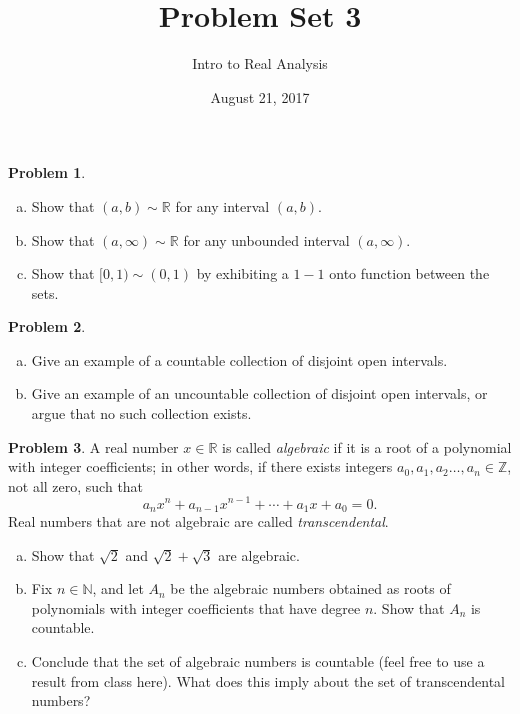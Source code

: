 \documentclass{amsart}
\newcommand{\+}[1]{\ensuremath{\mathbf{#1}}}
\newcommand{\Z}{{\mathbb Z}}
\newcommand{\R}{{\mathbb R}}
\theoremstyle{definition}
\newtheorem{prob}{Problem}
\begin{document}
\title{Problem Set 3}
\date{August 21, 2017}
\author{Intro to Real Analysis}

\maketitle




\begin{prob}
\begin{enumerate}[(a)]
 \item Show that $(a,b) \sim \R$ for any interval $(a,b)$.
 \item Show that $(a, \infty) \sim \R$
 for any unbounded interval $(a, \infty)$.
 \item Show that $[0,1) \sim (0,1)$
 by exhibiting a $1-1$ onto function between the sets.
\end{enumerate}
\end{prob}

\begin{prob}
\begin{enumerate}[(a)]
 \item Give an example of a countable collection of 
 disjoint open intervals.
 \item Give an example of an uncountable collection of 
 disjoint open intervals, or argue that no such 
 collection exists.
\end{enumerate}
\end{prob}

\begin{prob}
 A real number $x \in \R$ is called \emph{algebraic}
 if it is a root of a polynomial with integer coefficients;
 in other words, if there exists integers $a_0, a_1, a_2 \ldots, a_n \in \Z$,
 not all zero, such that
 \[
 a_nx^n + a_{n-1}x^{n-1} + \cdots + a_1x + a_0 = 0.
 \]
 Real numbers that are not algebraic are called
 \emph{transcendental}.
 \begin{enumerate}[(a)]
  \item Show that $\sqrt{2}$ and $\sqrt{2} + \sqrt{3}$
  are algebraic.
  \item Fix $n \in \mathbb{N}$, and let $A_n$ be the algebraic
  numbers obtained as roots of polynomials with integer coefficients
  that have degree $n$.
  Show that $A_n$ is countable.
  \item Conclude that the set of algebraic numbers
  is countable (feel free to use a result from class here).
  What does this imply about the set of
  transcendental numbers?
 \end{enumerate}
\end{prob}
\end{document}
